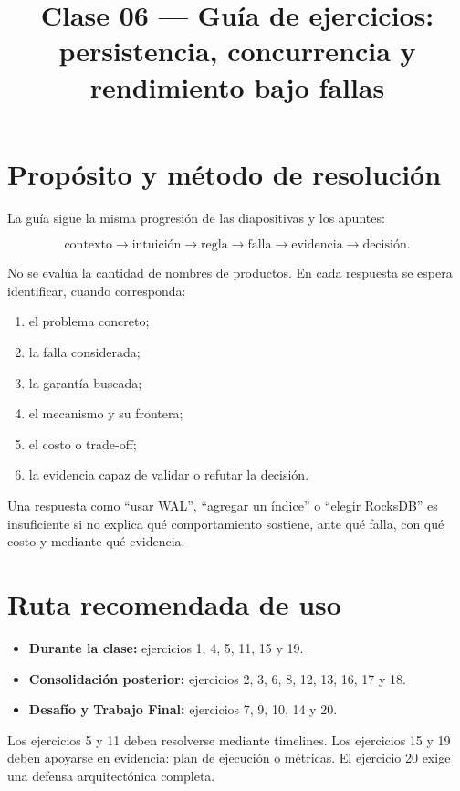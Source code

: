 \documentclass[variant=guia,cover=institutional,mode=screen]{ua-engineering-v6-article}
\title{Clase 06 --- Guía de ejercicios: persistencia, concurrencia y rendimiento bajo fallas}
\author{\UAProfessor}
\date{\UADate}
\begin{document}
\maketitle

\section{Propósito y método de resolución}

La guía sigue la misma progresión de las diapositivas y los apuntes:

\[
\text{contexto} \rightarrow \text{intuición} \rightarrow \text{regla}
\rightarrow \text{falla} \rightarrow \text{evidencia} \rightarrow \text{decisión}.
\]

No se evalúa la cantidad de nombres de productos. En cada respuesta se espera identificar, cuando corresponda:

\begin{enumerate}
\item el problema concreto;
\item la falla considerada;
\item la garantía buscada;
\item el mecanismo y su frontera;
\item el costo o trade-off;
\item la evidencia capaz de validar o refutar la decisión.
\end{enumerate}

\begin{uakeybox}
Una respuesta como ``usar WAL'', ``agregar un índice'' o ``elegir RocksDB'' es insuficiente si no explica qué comportamiento sostiene, ante qué falla, con qué costo y mediante qué evidencia.
\end{uakeybox}

\section{Ruta recomendada de uso}

\begin{itemize}
\item \textbf{Durante la clase:} ejercicios 1, 4, 5, 11, 15 y 19.
\item \textbf{Consolidación posterior:} ejercicios 2, 3, 6, 8, 12, 13, 16, 17 y 18.
\item \textbf{Desafío y Trabajo Final:} ejercicios 7, 9, 10, 14 y 20.
\end{itemize}

Los ejercicios 5 y 11 deben resolverse mediante timelines. Los ejercicios 15 y 19 deben apoyarse en evidencia: plan de ejecución o métricas. El ejercicio 20 exige una defensa arquitectónica completa.
\end{document}
